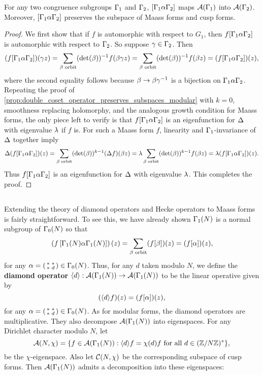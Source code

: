       \begin{proposition}\label{prop:double_coset_operator_preserves_subspaces_Maass}
        For any two congruence subgroups $\Gamma_{1}$ and $\Gamma_{2}$, $[\Gamma_{1}\alpha\Gamma_{2}]$ maps $\mathcal{A}(\Gamma_{1})$ into $\mathcal{A}(\Gamma_{2})$. Moreover, $[\Gamma_{1}\alpha\Gamma_{2}]$ preserves the subspace of Maass forms and cusp forms.
      \end{proposition}
      \begin{proof}
        We first show that if $f$ is automorphic with respect to $G_{1}$, then $f[\Gamma_{1}\alpha\Gamma_{2}]$ is automorphic with respect to $\Gamma_{2}$. So suppose $\gamma \in \Gamma_{2}$. Then
        \[
          (f[\Gamma_{1}\alpha\Gamma_{2}])(\gamma z) = \sum_{\beta \text{ orbit}}(\det(\beta))^{-1}f(\beta \gamma z) = \sum_{\beta \text{ orbit}}(\det(\beta))^{-1}f(\beta z) = (f[\Gamma_{1}\alpha\Gamma_{2}])(z),
        \]
        where the second equality follows because $\beta \to \beta\gamma^{-1}$ is a bijection on $\Gamma_{1}\alpha\Gamma_{2}$. Repeating the proof of \cref{prop:double_coset_operator_preserves_subspaces_modular} with $k = 0$, smoothness replacing holomorphy, and the analogous growth condition for Maass forms, the only piece left to verify is that $f[\Gamma_{1}\alpha\Gamma_{2}]$ is an eigenfunction for $\Delta$ with eigenvalue $\lambda$ if $f$ is. For such a Maass form $f$, linearity and $\Gamma_{1}$-invariance of $\Delta$ together imply
        \[
          \Delta(f[\Gamma_{1}\alpha\Gamma_{2}])(z) = \sum_{\beta \text{ orbit}}(\det(\beta))^{k-1}(\Delta f)(\beta z) = \lambda\sum_{\beta \text{ orbit}}(\det(\beta))^{k-1}f(\beta z) = \lambda(f[\Gamma_{1}\alpha\Gamma_{2}])(z). 
        \]
        Thus $f[\Gamma_{1}\alpha\Gamma_{2}]$ is an eigenfunction for $\Delta$ with eigenvalue $\lambda$. This completes the proof.
      \end{proof}
    \subsection*{}
      Extending the theory of diamond operators and Hecke operators to Maass forms is fairly straightforward. To see this, we have already shown $\Gamma_{1}(N)$ is a normal subgroup of $\Gamma_{0}(N)$ so that
      \[
        \left(f\left[\Gamma_{1}(N)\alpha\Gamma_{1}(N)\right]\right)(z) = \sum_{\beta \text{ orbit}}(f[\beta])(z) = (f[\alpha])(z),
      \]
      for any $\alpha = \begin{psmallmatrix} \ast & \ast \\ \ast & d \end{psmallmatrix} \in \Gamma_{0}(N)$. Thus, for any $d$ taken modulo $N$, we define the \textbf{diamond operator} $\langle d\rangle:\mathcal{A}(\Gamma_{1}(N)) \to \mathcal{A}(\Gamma_{1}(N))$ to be the linear operative given by
      \[
        (\langle d\rangle f)(z) = (f[\alpha])(z),
      \]
      for any $\alpha = \begin{psmallmatrix} \ast & \ast \\ \ast & d \end{psmallmatrix} \in \Gamma_{0}(N)$. As for modular forms, the diamond operators are multiplicative. They also decompose $\mathcal{A}(\Gamma_{1}(N))$ into eigenspaces. For any Dirichlet character modulo $N$, let
      \[
        \mathcal{A}(N,\chi) = \{f \in \mathcal{A}(\Gamma_{1}(N)):\langle d\rangle f = \chi(d)f \text{ for all } d \in (\mathbb{Z}/N\mathbb{Z})^{\ast}\},
      \]
      be the $\chi$-eigenspace. Also let $\mathcal{C}(N,\chi)$ be the corresponding subspace of cusp forms. Then $\mathcal{A}(\Gamma_{1}(N))$ admits a decomposition into these eigenspaces:

